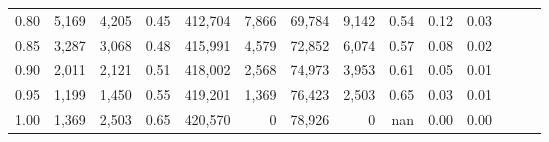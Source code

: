 \begin{tabular}{rrrrrrrrrrrrrr}
0.80 &   5,169 &  4,205 &  0.45 &  412,704 &    7,866 &  69,784 &   9,142 &  0.54 &  0.12 &      0.03 \\
0.85 &   3,287 &  3,068 &  0.48 &  415,991 &    4,579 &  72,852 &   6,074 &  0.57 &  0.08 &      0.02 \\
0.90 &   2,011 &  2,121 &  0.51 &  418,002 &    2,568 &  74,973 &   3,953 &  0.61 &  0.05 &      0.01 \\
0.95 &   1,199 &  1,450 &  0.55 &  419,201 &    1,369 &  76,423 &   2,503 &  0.65 &  0.03 &      0.01 \\
1.00 &   1,369 &  2,503 &  0.65 &  420,570 &        0 &  78,926 &       0 &   nan &  0.00 &      0.00 \\
\bottomrule
\end{tabular}
